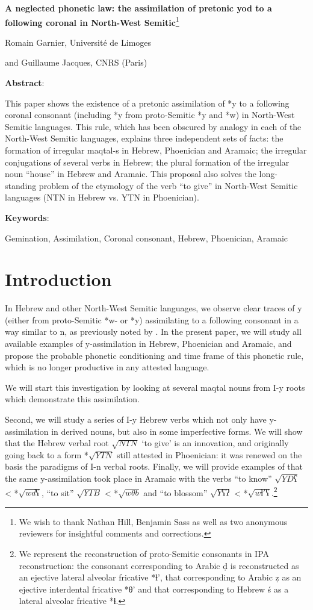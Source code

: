\documentclass[oldfontcommands,oneside,a4paper,11pt]{article}
\newcommand{\racine}[1]{\begin{math}\sqrt{#1}\end{math}}
\begin{document}
\noindent \textbf{\Large A neglected phonetic law: the assimilation of pretonic yod to a following coronal in North-West Semitic}\footnote{We wish to thank Nathan Hill, Benjamin Sass  as well as two anonymous reviewers for insightful comments and corrections.}


\noindent Romain Garnier, Université de Limoges 

\noindent and Guillaume Jacques, CNRS (Paris)

\noindent \textbf{Abstract}: 
\begin{sloppypar}
This paper shows the existence of a pretonic assimilation of *y to a following coronal consonant (including *y from proto-Semitic *y and *w) in North-West Semitic languages.  This rule, which has been obscured by analogy in each of the North-West Semitic languages, explains three independent sets of facts: the formation of irregular maqtal-s in Hebrew, Phoenician and Aramaic; the irregular conjugations of several verbs in Hebrew; the plural formation of the irregular noun ``house'' in Hebrew and Aramaic.  This proposal also solves the long-standing problem of the etymology of the verb ``to give'' in North-West Semitic languages (NTN in Hebrew vs. YTN in Phoenician).

\noindent  \textbf{Keywords}: 

Gemination, Assimilation, Coronal consonant, Hebrew, Phoenician, Aramaic
  
\pagebreak
\section{Introduction}


In Hebrew and other North-West Semitic languages, we observe clear traces of y (either from proto-Semitic *w- or *y) assimilating to a following consonant in a way similar to n, as previously noted by  \citet{huehnergard06}. In the present paper, we will study all available examples of y-assimilation in Hebrew, Phoenician and Aramaic, and propose the probable phonetic conditioning and time frame of this phonetic rule, which is no longer productive in any attested language.  

We will start this investigation by looking at several maqtal nouns from I-y roots which demonstrate  this assimilation. 

Second, we will study a series of I-y Hebrew verbs which not only have y-assimilation in derived nouns, but also in some imperfective forms. We will show that the Hebrew verbal root \racine{NTN} ‘to give’ is an innovation, and originally going back to a form *\racine{YTN} still attested in Phoenician: it was renewed on the basis the paradigms of I-n verbal roots. Finally, we will provide examples of that the same y-assimilation took place in Aramaic with the verbs ``to know'' \racine{YDʕ} < *\racine{wdʕ}, ``to sit'' \racine{YTB} < *\racine{wθb} and ``to blossom'' \racine{Yʕʔ} < *\racine{wɬ'ʕ}.\footnote{We represent the reconstruction of proto-Semitic consonants in IPA reconstruction: the consonant corresponding to Arabic ḍ is reconstructed as an ejective lateral alveolar fricative *ɬ', that corresponding to Arabic ẓ as an ejective interdental fricative *θ' and that corresponding to Hebrew ś as a lateral alveolar fricative *ɬ.}


\end{sloppypar}
\end{document}
